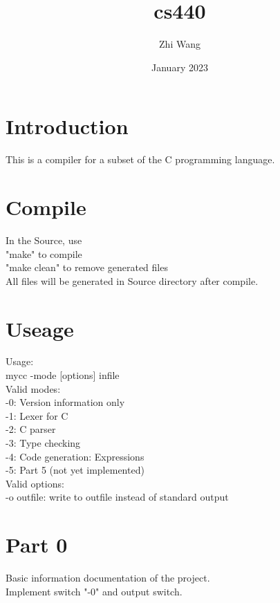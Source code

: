 \documentclass{article}
\title{cs440}
\author{Zhi Wang}
\date{January 2023}
\begin{document}
\maketitle

\section{Introduction}
This is a compiler for a subset of the C programming language.

\section{Compile}
In the Source, use\\
"make" to compile\\
"make clean" to remove generated files\\
All files will be generated in Source directory after compile.

\section{Useage}
Usage:\\
	mycc -mode [options] infile\\
Valid modes:\\
	-0: Version information only\\
	-1: Lexer for C\\
	-2: C parser\\
	-3: Type checking\\
	-4: Code generation: Expressions\\
	-5: Part 5 (not yet implemented)\\
Valid options:\\
	-o outfile: write to outfile instead of standard output\\


\section{Part 0}
Basic information documentation of the project.\\
Implement switch "-0" and output switch.
\end{document}
